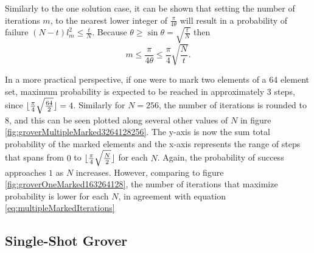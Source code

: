 \documentclass[../../dissertation.tex]{subfiles}
\begin{document}
Similarly to the one solution case, it can be shown that setting the number of iterations $m$, to the nearest lower integer of $\frac{\pi}{4\theta}$ will result in a probability of failure $(N-t)l^2_m \leq \frac{t}{N}$. Because $\theta \geq \sin\theta = \sqrt{\frac{t}{N}}$ then
\begin{equation}
	m \leq \frac{\pi}{4\theta} \leq \frac{\pi}{4}\sqrt{\frac{N}{t}}.
	\label{eq:multipleMarkedIterations}
\end{equation}\par
In a more practical perspective, if one were to mark two elements of a $64$ element set, maximum probability is expected to be reached in approximately 3 steps, since $\lfloor\frac{\pi}{4}\sqrt{\frac{64}{2}}\rfloor = 4$. Similarly for $N=256$, the number of iterations is rounded to $8$, and this can be seen plotted along several other values of $N$ in figure \ref{fig:groverMultipleMarked3264128256}. The y-axis is now the sum total probability of the marked elements and the x-axis represents the range of steps that spans from $0$ to $\lfloor\frac{\pi}{4}\sqrt{\frac{N}{2}}\rfloor$ for each $N$.
Again, the probability of success approaches $1$ as $N$ increases. However, comparing to figure \ref{fig:groverOneMarked163264128}, the number of iterations that maximize probability is lower for each $N$, in agreement with equation \ref{eq:multipleMarkedIterations}
\subsection{Single-Shot Grover}
\end{document}
